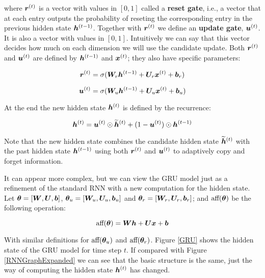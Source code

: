 where $\bm{r}^{(t)}$ is a vector with values in $[0, 1]$ called a \textbf{reset gate}, i.e.,  a vector that at each entry outputs the probability of reseting the  corresponding entry in the previous hidden state $\bm{h}^{(t-1)}$. Together with $\bm{r}^{(t)}$ we define an \textbf{update gate}, $\bm{u}^{(t)}$. It is also a vector with values in $[0, 1]$. Intuitively we can say that this vector decides how much on each dimension we will use the candidate update. Both $\bm{r}^{(t)}$ and $\bm{u}^{(t)}$ are defined by $\bm{h}^{(t-1)}$ and $\bm{x}^{(t)}$; they also have specific parameters:

\begin{equation}
\bm{r}^{(t)} = \sigma(\bm{W}_{r} \bm{h}^{(t-1)} + \bm{U}_{r} \bm{x}^{(t)} + \bm{b}_{r})
\end{equation}


\begin{equation}
\bm{u}^{(t)} = \sigma(\bm{W}_{u} \bm{h}^{(t-1)} + \bm{U}_{u} \bm{x}^{(t)} + \bm{b}_{u})
\end{equation}

At the end the new hidden state $\bm{h}^{(t)}$ is defined by the recurrence:

\begin{equation}
\bm{h}^{(t)} = \bm{u}^{(t)} \odot \bm{\widetilde{h}}^{(t)} + (1 - \bm{u}^{(t)}) \odot \bm{h}^{(t-1)} 
\end{equation}

Note that the new hidden state combines the candidate hidden state $\bm{\widetilde{h}}^{(t)}$ with the past hidden state $\bm{h}^{(t-1)}$ using both $\bm{r}^{(t)}$ and $\bm{u}^{(t)}$ to adaptively copy and forget information.

\par It can appear more complex, but we can view the GRU model just as a refinement of the standard RNN with a new computation for the hidden state. Let $\bm{\theta} = [ \bm{W},\bm{U},\bm{b} ]$, $\bm{\theta}_{u} = [ \bm{W}_{u},\bm{U}_{u},\bm{b}_{u} ]$  and $\bm{\theta}_{r} = [ \bm{W}_{r},\bm{U}_{r},\bm{b}_{r} ]$; and $\text{aff}(\bm{\theta})$ be the following operation:

\begin{equation}
\text{aff}(\bm{\theta}) = \bm{W} \bm{h} + \bm{U} \bm{x} + \bm{b}
\end{equation}

With similar definitions for $\text{aff}(\bm{\theta}_{u})$ and $\text{aff}(\bm{\theta}_{r})$. Figure \ref{GRU} shows the hidden state of the GRU model for time step $t$. If compared with Figure \ref{RNNGraphExpanded} we can see that the basic structure is the same, just the way of computing the hidden state $\bm{h}^{(t)}$ has changed.

